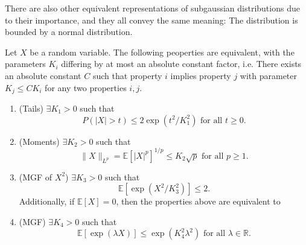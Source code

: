 There are also other equivalent representations of subgaussian distributions due to their importance, and 
they all convey the same meaning: The distribution is bounded by a normal distribution. 

\begin{proposition}
\label{prop:2.6.2}
Let $X$ be a random variable. The following peoperties are equivalent, with the parameters $K_i$ differing 
by at most an absolute constant factor, i.e. There exists an absolute constant $C$ such that property $i$ 
implies property $j$ with parameter $K_j \leq CK_i$ for any two properties $i, j$.
\begin{enumerate}
	\item (Tails) $\exists K_1 > 0$ such that 
	\[ P(|X| > t) \leq 2\exp{(t^2 / K_1^2)} \text{ for all } t \geq 0. \]
	\item (Moments) $\exists K_2 > 0$ such that 
	\[ \|X\|_{L^p} = \mathbb{E}[|X|^p]^{1/p} \leq K_2 \sqrt{p} \text{ for all } p \geq 1. \]
	\item (MGF of $X^2$) $\exists K_3 > 0$ such that 
	\[ \mathbb{E}[\exp{(X^2 / K_3^2)}] \leq 2. \]
	Additionally, if $\mathbb{E}[X] = 0$, then the properties above are equivalent to 
	\item (MGF) $\exists K_4 > 0$ such that 
	\[ \mathbb{E}[\exp{(\lambda X)}] \leq \exp{(K_4^2 \lambda^2)} \text{ for all } \lambda \in \mathbb{R}. \]
\end{enumerate}
\end{proposition}

